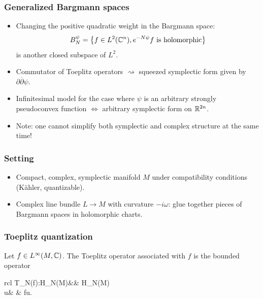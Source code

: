 \documentclass[mathserif]{beamer}
\begin{document}
\begin{frame}\frametitle{Generalized Bargmann spaces}
  \begin{itemize}
    \item Changing the positive quadratic weight in the Bargmann space:
  \[
    B_N^{\psi}=\left\{f\in L^2(\mathbb{C}^n), e^{-N\psi}f \text{ is
        holomorphic}\right\}
  \]
  is another closed subspace of $L^2$.

  \item<2-> Commutator of Toeplitz operators $\rightsquigarrow$
    squeezed symplectic form given by
    $\partial\overline{\partial}\psi$.
    
  \item<3-> Infinitesimal model for the case where $\psi$ is an
    arbitrary strongly pseudoconvex function $\Leftrightarrow$ arbitrary
    symplectic form on $\mathbb{R}^{2n}$.
      \item<4> Note: one cannot simplify both symplectic and complex
          structure at the same time!
      \end{itemize}
    \end{frame}
    
\begin{frame}
  \frametitle{Setting}
  \begin{itemize}
  \item Compact, complex, symplectic manifold $M$
    under compatibility conditions (K\"ahler, quantizable).
    \item<2-> Complex line bundle $L\to M$ with curvature
  $-i\omega$: glue together pieces of Bargmann spaces in holomorphic charts.
  \end{itemize}
\end{frame}


\begin{frame}
  \frametitle{Toeplitz quantization}
  Let $f\in L^{\infty}(M,\mathbb{C})$. The Toeplitz operator associated
  with $f$ is the bounded operator
\begin{center}
\begin{array}{rcl}
 		T_N(f):H_N(M)&\to & H_N(M)\\
		u& \mapsto& fu\uncover<2>{)}.
 		\end{array}
\end{center}
\end{frame}
\end{document}
